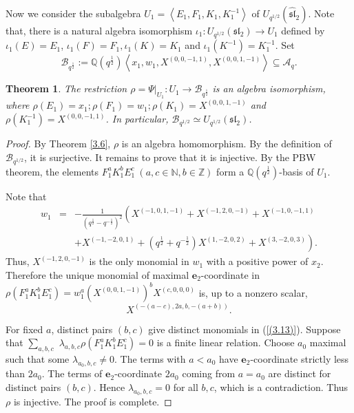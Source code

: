 \documentclass[reqno,11pt]{amsart}
\numberwithin{equation}{section}
\newtheorem{theorem}{Theorem}[section]
\begin{document}
 Now we consider the subalgebra $U_1=\left\langle E_1, F_1, K_1, K_1^{-1}\right\rangle$ of $U_{q^{1/2}}(\widehat{\mathfrak{s l}}_2)$. Note that, there is a natural algebra isomorphism $\iota_1: U_{q^{1/2}}(\mathfrak{s} \mathfrak{l}_2) \longrightarrow U_1$ defined by $\iota_1(E)=E_1$, $\iota_1(F)=F_1, \iota_1(K)=K_1$ and $\iota_1\left(K^{-1}\right)=K_1^{-1}$. Set
$$\mathcal{B}_{q^{\frac{1}{2}}}:=\mathbb{Q}\left(q^{\frac{1}{2}}\right)\left\langle x_1, w_1, X^{(0,0,-1,1)}, X^{(0,0,1,-1)}\right\rangle \subseteq \mathcal{A}_q .$$

\begin{theorem}\label{3.9}
	The restriction $\rho=\left.\Psi\right|_{U_1}: U_1 \longrightarrow \mathcal{B}_{q^{\frac{1}{2}}}$ is an algebra isomorphism, where $\rho\left(E_1\right)=x_1; \rho\left(F_1\right)=w_1; \rho\left(K_1\right)=X^{(0,0,1,-1)}$ and $\rho\left(K_1^{-1}\right)=X^{(0,0,-1,1)}$. In particular, $\mathcal{B}_{q^{1/2}} \simeq U_{q^{1/2}}(\mathfrak{s l}_2)$.
\end{theorem}
\begin{proof}
 By Theorem \ref{3.6}, $\rho$ is an algebra homomorphism. By the definition of $\mathcal{B}_{q^{1/2}}$, it is surjective. It remains to prove that it is injective. By the PBW theorem, the elements $F_1^a K_1^b E_1^c\ (a, c \in \mathbb{N}, b \in \mathbb{Z})$ form a $\mathbb{Q}\left(q^{\frac{1}{2}}\right)$-basis of $U_1$.

Note that
\begin{eqnarray*}
	w_1&= &-\frac{1}{\left(q^{\frac{1}{2}}-q^{-\frac{1}{2}}\right)^2}\left(X^{(-1,0,1,-1)}+X^{(-1,2,0,-1)}+X^{(-1,0,-1,1)}\right. \\
	&& \left.+X^{(-1,-2,0,1)}+\left(q^{\frac{1}{2}}+q^{-\frac{1}{2}}\right) X^{(1,-2,0,2)}+X^{(3,-2,0,3)}\right) .
	\end{eqnarray*}
Thus, $X^{(-1,2,0,-1)}$ is the only monomial in $w_1$ with a positive power of $x_2$. Therefore the unique monomial of maximal $\mathbf{e}_2$-coordinate in $\rho\left(F_1^a K_1^b E_1^c\right)=w_1^a\left(X^{(0,0,1,-1)}\right)^b X^{(c, 0,0,0)}$ is, up to a nonzero scalar,
\begin{equation}
	X^{(-(a-c), 2 a, b,-(a+b))} . \label{(3.13)}
\end{equation}

For fixed $a$, distinct pairs $(b, c)$ give distinct monomials in (\ref{(3.13)}).
Suppose that $\sum_{a, b, c} $ $\lambda_{a, b, c} \rho\left(F_1^a K_1^b E_1^c\right)=0$ is a finite linear relation. Choose $a_0$ maximal such that some $\lambda_{a_0, b, c} \neq 0$. The terms with $a<a_0$ have $\mathbf{e}_2$-coordinate strictly less than $2 a_0$. The terms of $\mathbf{e}_2$-coordinate $2 a_0$ coming from $a=a_0$ are distinct for distinct pairs $(b, c)$.  Hence $\lambda_{a_0, b, c}=0$ for all $b, c$, which is a contradiction. Thus  $\rho$ is injective. The proof is complete.
\end{proof}
\end{document}
